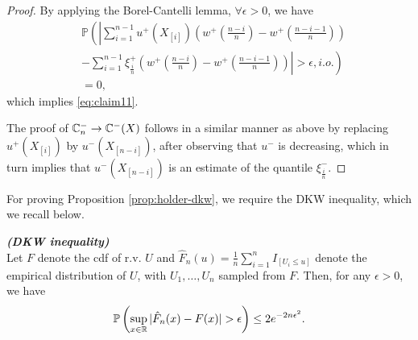 \begin{proof}
By applying the Borel-Cantelli lemma,  $\forall \epsilon >0$, we have 
\begin{align*}
&\mathbb{P} \left( \left| \sum_{i=1}^{n-1} u^+\left(X_{[i]}\right)  \left(w^+\left(\frac{n-i}{n} \right)  - w^+\left(\frac{n-i-1}{n} \right) \right)\right.\right. \\
&\left.\left.-
\sum_{i=1}^{n-1} \xi^+_{\frac{i}{n}}  \left(w^+\left(\frac{n-i}{n} \right)  - w^+\left(\frac{n-i-1}{n} \right) \right) \right| >
\epsilon , i.o.\right) \\
&=0, 
\end{align*}
which implies  \eqref{eq:claim11}. 

The proof of 
$\mathbb{C}_{n}^{-} \rightarrow \mathbb{C}^{-}(X)$ follows in a similar manner as above by replacing $u^+(X_{[i]})$ by $u^-(X_{[n-i]})$, after observing that $u^{-}$ is decreasing, which in turn implies that
$u^-(X_{[n-i]})$ is an estimate of the quantile $\xi^{-}_{\frac{i}{n}}$.
\end{proof}


For proving Proposition \ref{prop:holder-dkw}, we require the DKW inequality, which we recall below.
\begin{lemma}{\textbf{\textit{(DKW inequality)}}}\\
Let $F$ denote the cdf of r.v. $U$ and ${\hat F_n}(u)=\frac{1}{n} \sum_{i=1}^n I_{\left[U_i \leq u\right]}$ denote the empirical distribution of $U$, with $U_1,\ldots,U_n$ sampled from $F$.
Then, for any $\epsilon>0$, we have
$$
\Prob{\sup_{x\in \mathbb{R}}|\hat{F}_n(x)-F(x)|>\epsilon } \leq 2 e^{-2n\epsilon^2}.
$$
\end{lemma}


